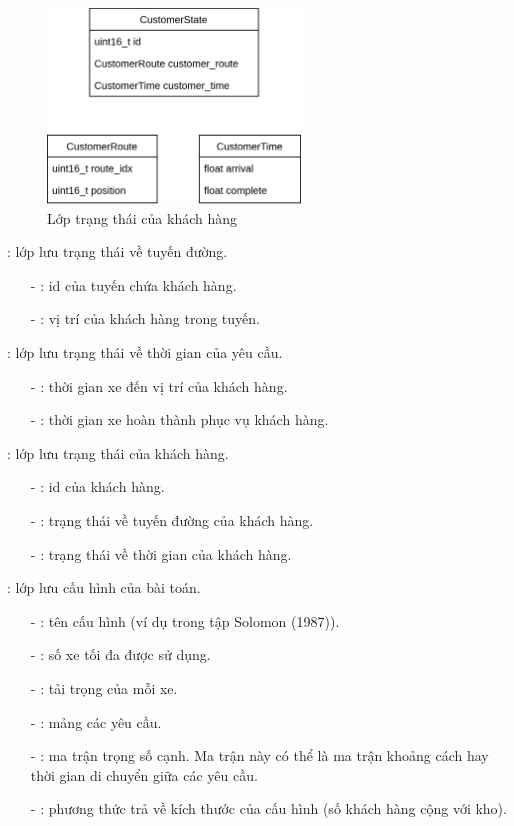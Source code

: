 \begin{figure}[H] %
	\centering %
	\includegraphics[width=0.6\textwidth]{figures/CustomerState.png}
	\caption{Lớp trạng thái của khách hàng}
	\label{fig:fg_03}
\end{figure}

: lớp lưu trạng thái về tuyến đường.
\begin{itemize}
	\item[-] : id của tuyến chứa khách hàng.
	\item[-] : vị trí của khách hàng trong tuyến.
\end{itemize}

: lớp lưu trạng thái về thời gian của yêu cầu.
\begin{itemize}
	\item[-] : thời gian xe đến vị trí của khách hàng.
	\item[-] : thời gian xe hoàn thành phục vụ khách hàng.
\end{itemize}

: lớp lưu trạng thái của khách hàng.
\begin{itemize}
	\item[-] : id của khách hàng.
	\item[-] : trạng thái về tuyến đường của khách hàng.
	\item[-] : trạng thái về thời gian của khách hàng.
\end{itemize}


: lớp lưu cấu hình của bài toán.
\begin{itemize}
	\item[-] : tên cấu hình (ví dụ  trong tập Solomon (1987)).
	\item[-] : số xe tối đa được sử dụng.
	\item[-] : tải trọng của mỗi xe.
	\item[-] : mảng các yêu cầu.
	\item[-] : ma trận trọng số cạnh. Ma trận này có thể là ma trận khoảng cách hay thời gian di chuyển giữa các yêu cầu.
	\item[-] : phương thức trả về kích thước của cấu hình (số khách hàng cộng với kho).
\end{itemize}

